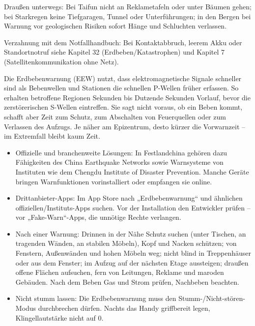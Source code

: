 Draußen unterwegs: Bei Taifun nicht an Reklametafeln oder unter Bäumen gehen; bei Starkregen keine Tiefgaragen, Tunnel oder Unterführungen; in den Bergen bei Warnung vor geologischen Risiken sofort Hänge und Schluchten verlassen.

Verzahnung mit dem Notfallhandbuch: Bei Kontaktabbruch, leerem Akku oder Standortnotruf siehe Kapitel 32 (Erdbeben/Katastrophen) und Kapitel 7 (Satellitenkommunikation ohne Netz).


Die Erdbebenwarnung (EEW) nutzt, dass elektromagnetische Signale schneller sind als Bebenwellen und Stationen die schnellen P-Wellen früher erfassen. So erhalten betroffene Regionen Sekunden bis Dutzende Sekunden Vorlauf, bevor die zerstörerischen S-Wellen eintreffen. Sie sagt nicht voraus, ob ein Beben kommt, schafft aber Zeit zum Schutz, zum Abschalten von Feuerquellen oder zum Verlassen des Aufzugs. Je näher am Epizentrum, desto kürzer die Vorwarnzeit – im Extremfall bleibt kaum Zeit.

\begin{itemize}
  \item Offizielle und branchenweite Lösungen: In Festlandchina gehören dazu Fähigkeiten des China Earthquake Networks sowie Warnsysteme von Instituten wie dem Chengdu Institute of Disaster Prevention. Manche Geräte bringen Warnfunktionen vorinstalliert oder empfangen sie online.
  \item Drittanbieter-Apps: Im App Store nach „Erdbebenwarnung“ und ähnlichen offiziellen/Instituts-Apps suchen. Vor der Installation den Entwickler prüfen – vor „Fake-Warn“-Apps, die unnötige Rechte verlangen.
  \item Nach einer Warnung: Drinnen in der Nähe Schutz suchen (unter Tischen, an tragenden Wänden, an stabilen Möbeln), Kopf und Nacken schützen; von Fenstern, Außenwänden und hohen Möbeln weg; nicht blind in Treppenhäuser oder aus dem Fenster; im Aufzug auf der nächsten Etage aussteigen; draußen offene Flächen aufsuchen, fern von Leitungen, Reklame und maroden Gebäuden. Nach dem Beben Gas und Strom prüfen, Nachbeben beachten.
  \item Nicht stumm lassen: Die Erdbebenwarnung muss den Stumm-/Nicht-stören-Modus durchbrechen dürfen. Nachts das Handy griffbereit legen, Klingellautstärke nicht auf 0.
\end{itemize}


